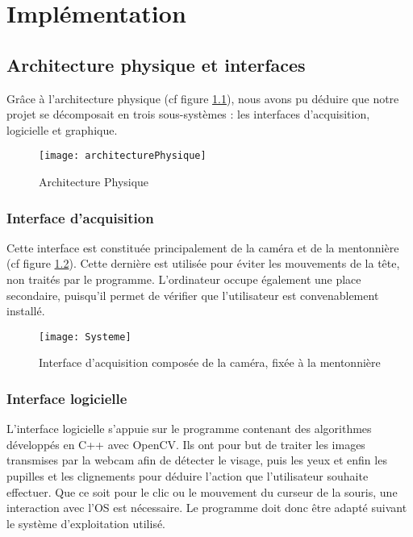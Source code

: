 \chapter{Implémentation}

\section{Architecture physique et interfaces}

Grâce à l'architecture physique (cf figure \ref{fig:archiPhysique}), nous avons pu déduire que notre projet se décomposait en trois sous-systèmes : les interfaces d'acquisition, logicielle et graphique.

\begin{figure}[H]
  \centering
  \texttt{[image: architecturePhysique]}
  \caption{Architecture Physique}
  \label{fig:archiPhysique}
\end{figure}

\subsection{Interface d'acquisition}
Cette interface est constituée principalement de la caméra et de la mentonnière (cf figure \ref{fig:systeme}). Cette dernière est utilisée pour éviter les mouvements de la tête, non traités par le programme. L'ordinateur occupe également une place secondaire, puisqu'il permet de vérifier que l'utilisateur est convenablement installé.

\begin{figure}[H]
  \centering
  \texttt{[image: Systeme]}
  \caption{Interface d'acquisition composée de la caméra, fixée à la mentonnière}
  \label{fig:systeme}
\end{figure}

\subsection{Interface logicielle}
L'interface logicielle s'appuie sur le programme contenant des algorithmes développés en C++ avec OpenCV. Ils ont pour but de traiter les images transmises par la webcam afin de détecter le visage, puis les yeux et enfin les pupilles et les clignements pour déduire l'action que l'utilisateur souhaite effectuer. Que ce soit pour le clic ou le mouvement du curseur de la souris, une interaction avec l'OS est nécessaire. Le programme doit donc être adapté suivant le système d'exploitation utilisé.

